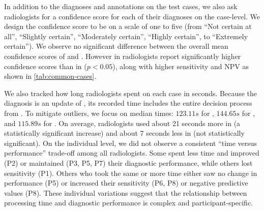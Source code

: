 In addition to the diagnoses and annotations on the test cases, we also ask radiologists for a confidence score for each of their diagnoses on the case-level.
We design the confidence score to be on a scale of one to five (from ``Not certain at all'', ``Slightly certain'', ``Moderately certain'', ``Highly certain'', to ``Extremely certain'').
We observe no significant difference between the overall mean confidence scores of \halone and \hai[1].
However in \hai[2] radiologists report significantly higher confidence scores than in \halone ($p<0.05$), along with higher sensitivity and NPV as shown in \cref{tab:common-cases}.



We also tracked how long radiologists spent on each case in seconds. Because the \hai[1] diagnosis is an update of \halone, its recorded time includes the entire decision process from \halone. To mitigate outliers, we focus on median times: $123.11s$ for \halone, $144.65s$ for \hai[1], and $115.89s$ for \hai[2]. On average, radiologists used about 21 seconds more in \hai[1] (a statistically significant increase) and about 7 seconds less in \hai[2] (not statistically significant).
On the individual level, we did not observe a consistent ``time versus performance'' trade-off among all radiologists.  
Some spent less time and improved (P2) or maintained (P3, P5, P7) their diagnostic performance, while others lost sensitivity (P1). 
Others who took the same or more time either saw no change in performance (P5) or increased their sensitivity (P6, P8) or negative predictive values (P8).
These individual variations suggest that the relationship between processing time and diagnostic performance is complex and participant-specific.

